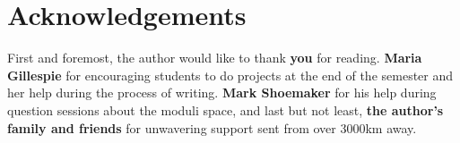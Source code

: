 \documentclass[11pt]{article}
\theoremstyle{definition}
\theoremstyle{remark}
\numberwithin{theorem}{section}
\begin{document}
\section{Acknowledgements}

First and foremost, the author would like to thank \textbf{you} for reading. \textbf{Maria Gillespie} for encouraging students to do projects at the end of the semester and her help during the process of writing. \textbf{Mark Shoemaker} for his help during question sessions about the moduli space, and last but not least, \textbf{the author's family and friends} for unwavering support sent from over 3000km away. 

\nocite{*}


\end{document}

